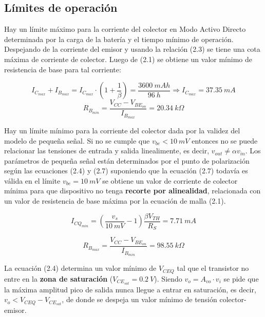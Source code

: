 \documentclass[a4paper, 10pt, spanish]{article}
\numberwithin{equation}{section}
\numberwithin{table}{section}
\begin{document}


\newpage
\subsection{Límites de operación}


Hay un límite máximo para la corriente del colector en Modo Activo Directo determinada por la carga de la batería y el tiempo mínimo de operación. Despejando de la corriente del emisor y usando la relación (2.3) se tiene una cota máxima de corriente de colector. Luego de (2.1) se obtiene un valor mínimo de resistencia de base para tal corriente:

\begin{equation}
I_C_{max} + I_B_{max} = I_C_{max} \cdot (1 + \frac{1}{\beta}) = \frac{3600\ mAh}{96\ h} \Rightarrow I_C_{max} = 37.35\ mA \nonumber
\end{equation}
\begin{equation}
R_{B}_{min} = \frac{V_{CC} - V_{BE}_{on}}{I_B_{max}} = 20.34\ k\Omega \nonumber
\end{equation}


Hay un límite mínimo para la corriente del colector dada por la validez del modelo de pequeña señal. Si no se cumple que $v_{be} < 10\ mV$ entonces no se puede relacionar las tensiones de entrada y salida linealimente, es decir, $v_{out} \neq \alpha v_{in}$. Los parámetros de pequeña señal están determinados por el punto de polarización según las ecuaciones (2.4) y (2.7) suponiendo que la ecuación (2.7) todavía es válida en el límite $v_{be} = 10\ mV$ se obtiene un valor de corriente de colector mínima para que dispositivo no tenga \textbf{recorte por alinealidad}, relacionada con un valor de resistencia de base máxima por la ecuación de malla (2.1).

\begin{equation}
I_{CQ}_{min} = (\frac{v_s}{10\ mV} - 1)\frac{\beta V_{TH}}{R_S} = 7.71\ mA \nonumber
\end{equation}

\begin{equation}
R_{B}_{max} = \frac{V_{CC} - V_{BE}_{on}}{I_B_{min}} = 98.55\ k\Omega \nonumber
\end{equation}

La ecuación (2.4) determina un valor mínimo de $V_{CEQ}$ tal que el transistor no entre en la \textbf{zona de saturación} ($V_{CE}_{sat} = 0.2\ V$). Siendo $v_o = A_{vo} \cdot v_i$ se pide que la máxima amplitud pico de salida nunca llegue a entrar en saturación, es decir, $v_o < V_{CEQ} - V_{CE}_{sat}$, de donde se despeja un valor mínimo de tensión colector-emisor.
\end{document}
